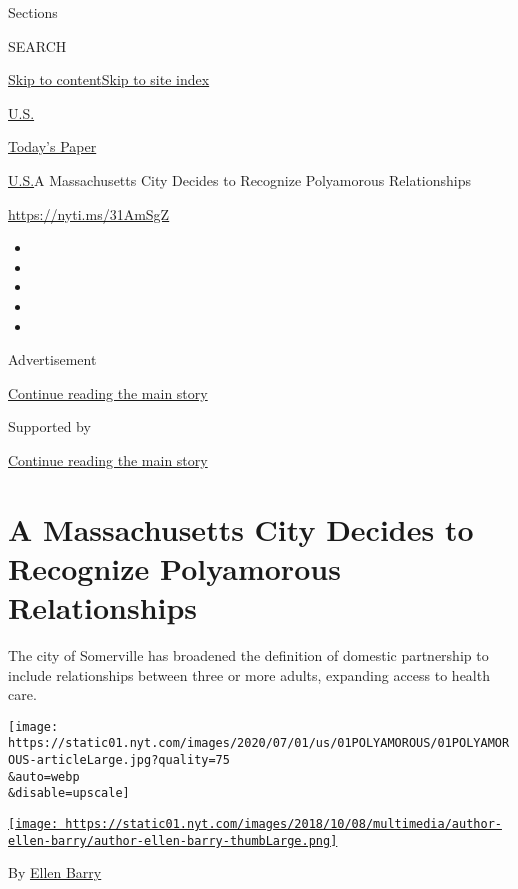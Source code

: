 Sections

SEARCH

\protect\hyperlink{site-content}{Skip to
content}\protect\hyperlink{site-index}{Skip to site index}

\href{https://www.nytimes.com/section/us}{U.S.}

\href{https://myaccount.nytimes.com/auth/login?response_type=cookie\&client_id=vi}{}

\href{https://www.nytimes.com/section/todayspaper}{Today's Paper}

\href{/section/us}{U.S.}\textbar{}A Massachusetts City Decides to
Recognize Polyamorous Relationships

\url{https://nyti.ms/31AmSgZ}

\begin{itemize}
\item
\item
\item
\item
\item
\end{itemize}

Advertisement

\protect\hyperlink{after-top}{Continue reading the main story}

Supported by

\protect\hyperlink{after-sponsor}{Continue reading the main story}

\hypertarget{a-massachusetts-city-decides-to-recognize-polyamorous-relationships}{%
\section{A Massachusetts City Decides to Recognize Polyamorous
Relationships}\label{a-massachusetts-city-decides-to-recognize-polyamorous-relationships}}

The city of Somerville has broadened the definition of domestic
partnership to include relationships between three or more adults,
expanding access to health care.

\texttt{[image: https://static01.nyt.com/images/2020/07/01/us/01POLYAMOROUS/01POLYAMOROUS-articleLarge.jpg?quality=75\\\&auto=webp\\\&disable=upscale]}

\href{https://www.nytimes.com/by/ellen-barry}{\texttt{[image: https://static01.nyt.com/images/2018/10/08/multimedia/author-ellen-barry/author-ellen-barry-thumbLarge.png]}}

By \href{https://www.nytimes.com/by/ellen-barry}{Ellen Barry}

